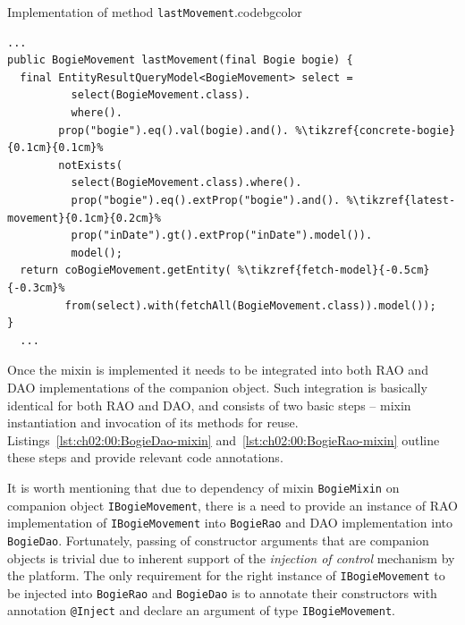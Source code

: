  \begin{code}{Implementation of method \texttt{lastMovement}.}{\label{lst:ch02:00:BogieMixin-impl}}{codebgcolor}
  \begin{lstlisting}
...
public BogieMovement lastMovement(final Bogie bogie) { 
  final EntityResultQueryModel<BogieMovement> select = 
	      select(BogieMovement.class).
	      where().
		prop("bogie").eq().val(bogie).and(). %\tikzref{concrete-bogie}{0.1cm}{0.1cm}%
		notExists(
		  select(BogieMovement.class).where(). 
		  prop("bogie").eq().extProp("bogie").and(). %\tikzref{latest-movement}{0.1cm}{0.2cm}%
		  prop("inDate").gt().extProp("inDate").model()).
	      model();
  return coBogieMovement.getEntity( %\tikzref{fetch-model}{-0.5cm}{-0.3cm}%
         from(select).with(fetchAll(BogieMovement.class)).model());    
}
  ...
  \end{lstlisting}
\end{code}
 
  Once the mixin is implemented it needs to be integrated into both RAO and DAO implementations of the companion object.
  Such integration is basically identical for both RAO and DAO, and consists of two basic steps -- mixin instantiation and invocation of its methods for reuse.
  Listings~\ref{lst:ch02:00:BogieDao-mixin} and~\ref{lst:ch02:00:BogieRao-mixin} outline these steps and provide relevant code annotations.
  
  It is worth mentioning that due to dependency of mixin \texttt{BogieMixin} on companion object \texttt{IBogieMovement}, there is a need to provide an instance of RAO implementation of \texttt{IBogieMovement} into \texttt{BogieRao} and DAO implementation into \texttt{BogieDao}.
  Fortunately, passing of constructor arguments that are companion objects is trivial due to inherent support of the \emph{injection of control} mechanism by the platform.
  The only requirement for the right instance of \texttt{IBogieMovement} to be injected into \texttt{BogieRao} and \texttt{BogieDao} is to annotate their constructors with annotation \texttt{@Inject} and declare an argument of type \texttt{IBogieMovement}.
  
